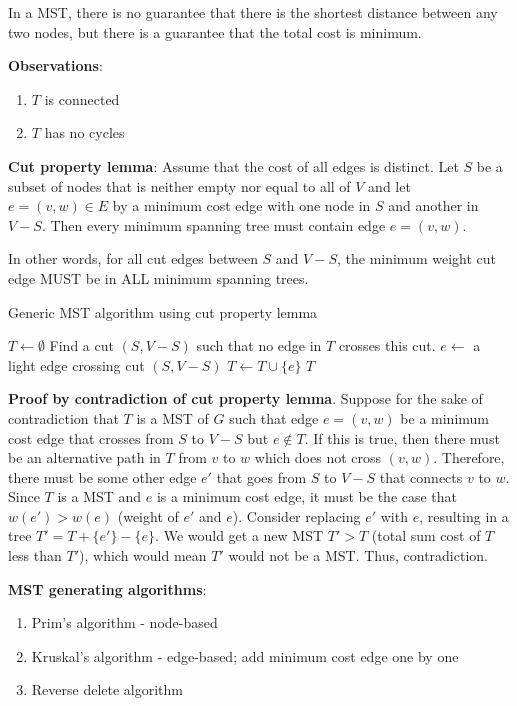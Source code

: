 \documentclass{article}
\begin{document}
In a MST, there is no guarantee that there is the shortest distance between any two nodes, but there is a guarantee that the total cost is minimum.

\textbf{Observations}:

\begin{enumerate}
    \item $T$ is connected
    \item $T$ has no cycles
\end{enumerate}

\textbf{Cut property lemma}: Assume that the cost of all edges is distinct. Let $S$ be a subset of nodes that is neither empty nor equal to all of $V$ and let $e = (v, w) \in E$ by a minimum cost edge with one node in $S$ and another in $V - S$. Then every minimum spanning tree must contain edge $e = (v, w)$.

In other words, for all cut edges between $S$ and $V - S$, the minimum weight cut edge MUST be in ALL minimum spanning trees.

\begin{algorithm}
\caption{Generic MST algorithm using cut property lemma}\label{genericMST}
\begin{algorithmic}
\State $T \gets \emptyset$
    \State Find a cut $(S, V - S)$ such that no edge in $T$ crosses this cut.
    \State $e \gets$ a light edge crossing cut $(S, V - S)$
    \State $T \gets T \cup \{e\}$
\EndWhile
\State \Return $T$
\EndProcedure
\end{algorithmic}
\end{algorithm}

\textbf{Proof by contradiction of cut property lemma}. Suppose for the sake of contradiction that $T$ is a MST of $G$ such that edge $e = (v, w)$ be a minimum cost edge that crosses from $S$ to $V - S$ but $e \notin T$. If this is true, then there must be an alternative path in $T$ from $v$ to $w$ which does not cross $(v, w)$. Therefore, there must be some other edge $e'$ that goes from $S$ to $V - S$ that connects $v$ to $w$. Since $T$ is a MST and $e$ is a minimum cost edge, it must be the case that $w(e') > w(e)$ (weight of $e'$ and $e$). Consider replacing $e'$ with $e$, resulting in a tree $T' = T + \{e'\} - \{e\}$. We would get a new MST $T' > T$ (total sum cost of $T$ less than $T'$), which would mean $T'$ would not be a MST. Thus, contradiction. 

\textbf{MST generating algorithms}:
\begin{enumerate}
    \item Prim's algorithm - node-based
    \item Kruskal's algorithm - edge-based; add minimum cost edge one by one
    \item Reverse delete algorithm
\end{enumerate}
\end{document}
